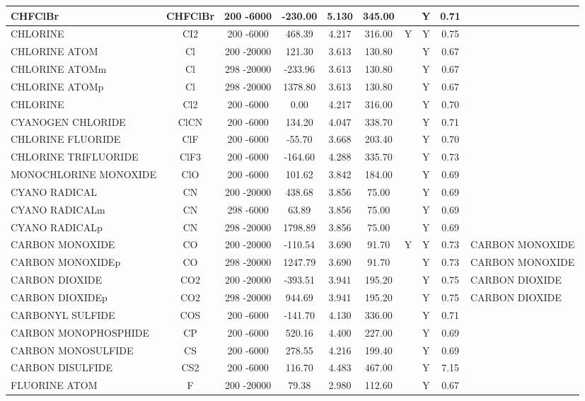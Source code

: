 \begin{longtable}{@{\extracolsep{\fill}}|l|c|c|c|c|c|c|c|c|l|}
CHFClBr&CHFClBr&200 -6000& -230.00& 5.130&   345.00& &Y& 0.71&\\ \hline
CHLORINE&CI2&200 -6000&  468.39& 4.217&   316.00&Y&Y& 0.75&\\ \hline
CHLORINE ATOM&Cl&200 -20000&  121.30& 3.613&   130.80& &Y& 0.67&\\ \hline
CHLORINE ATOMm&Cl&298 -20000& -233.96& 3.613&   130.80& &Y& 0.67&\\ \hline
CHLORINE ATOMp&Cl&298 -20000& 1378.80& 3.613&   130.80& &Y& 0.67&\\ \hline
CHLORINE&Cl2&200 -6000&    0.00& 4.217&   316.00& &Y& 0.70&\\ \hline
CYANOGEN CHLORIDE&ClCN&200 -6000&  134.20& 4.047&   338.70& &Y& 0.71&\\ \hline
CHLORINE FLUORIDE&ClF&200 -6000&  -55.70& 3.668&   203.40& &Y& 0.70&\\ \hline
CHLORINE TRIFLUORIDE&ClF3&200 -6000& -164.60& 4.288&   335.70& &Y& 0.73&\\ \hline
MONOCHLORINE MONOXIDE&ClO&200 -6000&  101.62& 3.842&   184.00& &Y& 0.69&\\ \hline
CYANO RADICAL&CN&200 -20000&  438.68& 3.856&    75.00& &Y& 0.69&\\ \hline
CYANO RADICALm&CN&298 -6000&   63.89& 3.856&    75.00& &Y& 0.69&\\ \hline
CYANO RADICALp&CN&298 -20000& 1798.89& 3.856&    75.00& &Y& 0.69&\\ \hline
CARBON MONOXIDE&CO&200 -20000& -110.54& 3.690&    91.70&Y&Y& 0.73&CARBON MONOXIDE\\ \hline
CARBON MONOXIDEp&CO&298 -20000& 1247.79& 3.690&    91.70& &Y& 0.73&CARBON MONOXIDE\\ \hline
CARBON DIOXIDE&CO2&200 -20000& -393.51& 3.941&   195.20& &Y& 0.75&CARBON DIOXIDE\\ \hline
CARBON DIOXIDEp&CO2&298 -20000&  944.69& 3.941&   195.20& &Y& 0.75&CARBON DIOXIDE\\ \hline
CARBONYL SULFIDE&COS&200 -6000& -141.70& 4.130&   336.00& &Y& 0.71&\\ \hline
CARBON MONOPHOSPHIDE&CP&200 -6000&  520.16& 4.400&   227.00& &Y& 0.69&\\ \hline
CARBON MONOSULFIDE&CS&200 -6000&  278.55& 4.216&   199.40& &Y& 0.69&\\ \hline
CARBON DISULFIDE&CS2&200 -6000&  116.70& 4.483&   467.00& &Y& 7.15&\\ \hline
FLUORINE ATOM&F&200 -20000&   79.38& 2.980&   112.60& &Y& 0.67&\\ \hline

\end{longtable}
